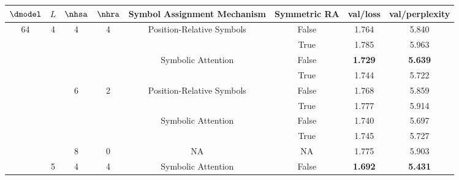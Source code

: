 
\begin{tabular}{@{}|c|c|c|c|c|c|c|c|@{}}
\toprule
$\dmodel$             & $L$                & $\nhsa$            & $\nhra$            & Symbol Assignment Mechanism                & Symmetric RA & val/loss       & val/perplexity \\
\midrule
\multirow{23}{*}{64}  & \multirow{9}{*}{4} & \multirow{4}{*}{4} & \multirow{4}{*}{4} & \multirow{2}{*}{Position-Relative Symbols} & False        & 1.764          & 5.840          \\
                        &                    &                    &                    &                                            & True         & 1.785          & 5.963          \\ \cline{5-8} 
                        &                    &                    &                    & \multirow{2}{*}{Symbolic Attention}        & False        & \textbf{1.729} & \textbf{5.639} \\
                        &                    &                    &                    &                                            & True         & 1.744          & 5.722          \\ \cline{3-8} 
                        &                    & \multirow{4}{*}{6} & \multirow{4}{*}{2} & \multirow{2}{*}{Position-Relative Symbols} & False        & 1.768          & 5.859          \\
                        &                    &                    &                    &                                            & True         & 1.777          & 5.914          \\ \cline{5-8} 
                        &                    &                    &                    & \multirow{2}{*}{Symbolic Attention}        & False        & 1.740          & 5.697          \\
                        &                    &                    &                    &                                            & True         & 1.745          & 5.727          \\ \cline{3-8} 
                        &                    & 8                  & 0                  & NA                                         & NA           & 1.775          & 5.903          \\ \cline{2-8} 
                        & \multirow{6}{*}{5} & \multirow{2}{*}{4} & \multirow{2}{*}{4} & \multirow{2}{*}{Symbolic Attention}        & False        & \textbf{1.692} & \textbf{5.431} \\

\end{tabular}
